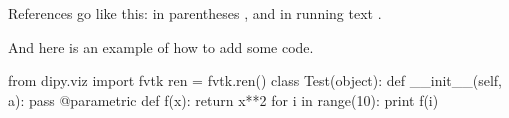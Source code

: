 \documentclass{bioinfo}
\begin{document}
References go like this: in parentheses \citep{Garyfallidis_thesis, Mori1999}, and in running text \citet{Garyfallidis_thesis}.

And here is an example of how to add some code.

\begin{python}
from dipy.viz import fvtk
ren = fvtk.ren()
class Test(object):
  def __init__(self, a):
    pass
@parametric
def f(x):
  return x**2
for i in range(10):
  print f(i)
\end{python}



%

%
%
%
%

\end{document}
